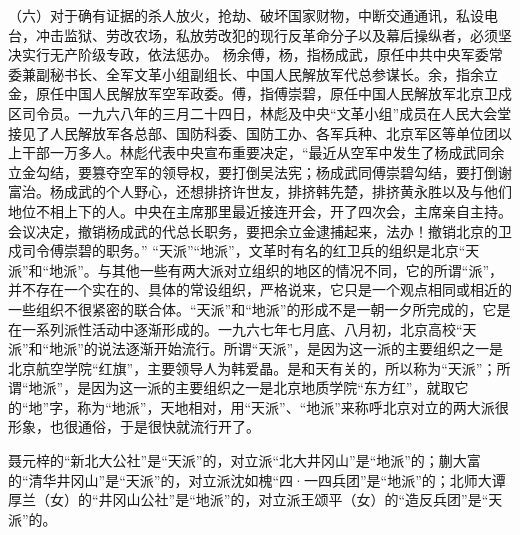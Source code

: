 \begin{maonote}
（六）对于确有证据的杀人放火，抢劫、破坏国家财物，中断交通通讯，私设电台，冲击监狱、劳改农场，私放劳改犯的现行反革命分子以及幕后操纵者，必须坚决实行无产阶级专政，依法惩办。
杨余傅，杨，指杨成武，原任中共中央军委常委兼副秘书长、全军文革小组副组长、中国人民解放军代总参谋长。余，指余立金，原任中国人民解放军空军政委。傅，指傅崇碧，原任中国人民解放军北京卫戍区司令员。一九六八年的三月二十四日，林彪及中央“文革小组”成员在人民大会堂接见了人民解放军各总部、国防科委、国防工办、各军兵种、北京军区等单位团以上干部一万多人。林彪代表中央宣布重要决定，“最近从空军中发生了杨成武同余立金勾结，要篡夺空军的领导权，要打倒吴法宪；杨成武同傅崇碧勾结，要打倒谢富治。杨成武的个人野心，还想排挤许世友，排挤韩先楚，排挤黄永胜以及与他们地位不相上下的人。中央在主席那里最近接连开会，开了四次会，主席亲自主持。会议决定，撤销杨成武的代总长职务，要把余立金逮捕起来，法办！撤销北京的卫戍司令傅崇碧的职务。”
“天派”“地派”，文革时有名的红卫兵的组织是北京“天派”和“地派”。与其他一些有两大派对立组织的地区的情况不同，它的所谓“派”，并不存在一个实在的、具体的常设组织，严格说来，它只是一个观点相同或相近的一些组织不很紧密的联合体。“天派”和“地派”的形成不是一朝一夕所完成的，它是在一系列派性活动中逐渐形成的。一九六七年七月底、八月初，北京高校“天派”和“地派”的说法逐渐开始流行。所谓“天派”，是因为这一派的主要组织之一是北京航空学院“红旗”，主要领导人为韩爱晶。是和天有关的，所以称为“天派”；所谓“地派”，是因为这一派的主要组织之一是北京地质学院“东方红”，就取它的“地”字，称为“地派”，天地相对，用“天派”、“地派”来称呼北京对立的两大派很形象，也很通俗，于是很快就流行开了。

聂元梓的“新北大公社”是“天派”的，对立派“北大井冈山”是“地派”的；蒯大富的“清华井冈山”是“天派”的，对立派沈如槐“四·一四兵团”是“地派”的；北师大谭厚兰（女）的“井冈山公社”是“地派”的，对立派王颂平（女）的“造反兵团”是“天派”的。


\end{maonote}
